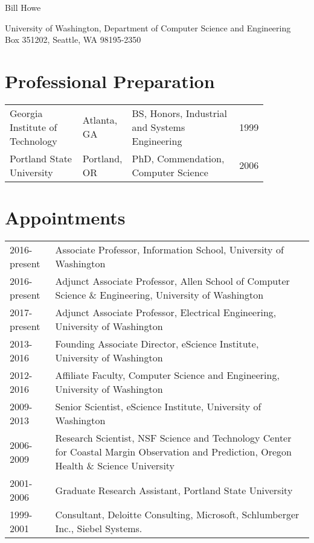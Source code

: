 \documentclass[10pt]{article}
\begin{document}
\begin{cv}{}

\centerline{\Large Bill Howe}
\vspace{0.5cm}

\noindent University of Washington, Department of Computer Science and Engineering \\
\noindent Box 351202, Seattle, WA 98195-2350 

\section*{Professional Preparation}
\noindent
\begin{tabular}{p{0.30\linewidth}p{.15\linewidth}p{0.45\linewidth}p{0.10\linewidth}}
Georgia Institute of Technology &  Atlanta, GA & BS, Honors, Industrial and Systems Engineering & 1999 \\
Portland State University & Portland, OR & PhD, Commendation, Computer Science & 2006 \\
\end{tabular}

\section*{Appointments}
\noindent
\begin{tabular}{p{0.15\linewidth}p{0.85\linewidth}}

2016-present & Associate Professor, Information School, University of Washington \\
2016-present & Adjunct Associate Professor, Allen School of Computer Science \& Engineering, University of Washington \\
2017-present & Adjunct Associate Professor, Electrical Engineering, University of Washington \\
2013-2016 & Founding Associate Director, eScience Institute, University of Washington \\
2012-2016 & Affiliate Faculty, Computer Science and Engineering, University of Washington \\
2009-2013 & Senior Scientist, eScience Institute, University of Washington \\
2006-2009 & Research Scientist, NSF Science and Technology Center for Coastal Margin Observation and  Prediction, Oregon Health \& Science University \\
2001-2006 & Graduate Research Assistant, Portland State University \\
1999-2001 & Consultant, Deloitte Consulting, Microsoft, Schlumberger Inc., Siebel Systems. \\
\end{tabular}


\end{cv}
\end{document}
